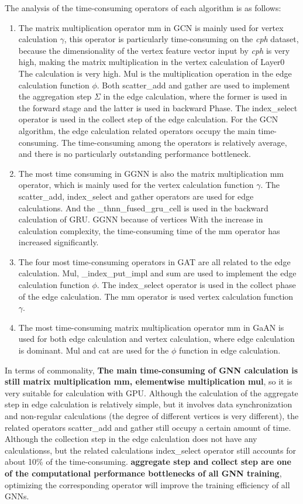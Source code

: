 The analysis of the time-consuming operators of each algorithm is as follows:

\begin{enumerate}
    \item The matrix multiplication operator mm in GCN is mainly used for vertex calculation $\gamma$, 
    this operator is particularly time-consuming on the \textit{cph} dataset, 
    because the dimensionality of the vertex feature vector input by \textit{cph} is very high,
    making the matrix multiplication in the vertex calculation of Layer0 The calculation is very high.
    Mul is the multiplication operation in the edge calculation function $\phi$.
    Both scatter\_add and gather are used to implement the aggregation step $\Sigma$ in the edge calculation,
    where the former is used in the forward stage and the latter is used in backward Phase.
    The index\_select operator is used in the collect step of the edge calculation.
    For the GCN algorithm, the edge calculation related operators occupy the main time-consuming.
    The time-consuming among the operators is relatively average, and there is no particularly outstanding performance bottleneck.
    \item The most time consuming in GGNN is also the matrix multiplication mm operator,
    which is mainly used for the vertex calculation function $\gamma$. The scatter\_add, index\_select and gather operators
    are used for edge calculations. And the \_thnn\_fused\_gru\_cell is used in the backward calculation of GRU.
    GGNN because of vertices With the increase in calculation complexity, the time-consuming time of the mm operator has increased significantly.
    \item The four most time-consuming operators in GAT are all related to the edge calculation. 
    Mul, \_index\_put\_impl and sum are used to implement the edge calculation function $\phi$.
    The index\_select operator is used in the collect phase of the edge calculation. 
    The mm operator is used vertex calculation function $\gamma$.
    \item The most time-consuming matrix multiplication operator mm in GaAN is used for both edge calculation and vertex calculation,
    where edge calculation is dominant. Mul and cat are used for the $\phi$ function in edge calculation.
\end{enumerate}

In terms of commonality, 
\textbf{The main time-consuming of GNN calculation is still matrix multiplication mm, elementwise multiplication mul},
so it is very suitable for calculation with GPU. Although the calculation of the aggregate step in edge calculation is relatively simple,
but it involves data synchronization and non-regular calculations (the degree of different vertices is very different),
the related operators scatter\_add and gather still occupy a certain amount of time.
Although the collection step in the edge calculation does not have any calculationss,
but the related calculations index\_select operator still accounts for about 10\% of the time-consuming.
\textbf{aggregate step and collect step are one of the computational performance bottlenecks of all GNN training},
optimizing the corresponding operator will improve the training efficiency of all GNNs.

